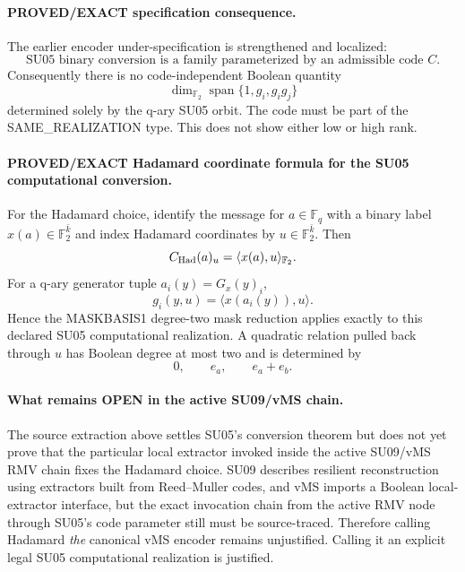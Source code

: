 \documentclass[11pt]{article}
\begin{document}
\paragraph{PROVED/EXACT specification consequence.}
The earlier encoder under-specification is strengthened and localized:
\[
\boxed{\text{SU05 binary conversion is a family parameterized by an admissible code }C.}
\]
Consequently there is no code-independent Boolean quantity
\[
\dim_{\mathbb F_2}\operatorname{span}\{1,g_i,g_ig_j\}
\]
determined solely by the q-ary SU05 orbit. The code must be part of the SAME\_REALIZATION type. This does not show either low or high rank.

\paragraph{PROVED/EXACT Hadamard coordinate formula for the SU05 computational conversion.}
For the Hadamard choice, identify the message for $a\in\mathbb F_q$ with a binary label $x(a)\in\mathbb F_2^{\bar k}$ and index Hadamard coordinates by $u\in\mathbb F_2^{\bar k}$. Then
\[
C_{\rm Had}(a)_u=\langle x(a),u\rangle_{\mathbb F_2}.
\]
For a q-ary generator tuple $a_i(y)=G_x(y)_i$,
\[
\boxed{g_i(y,u)=\langle x(a_i(y)),u\rangle.}
\]
Hence the MASKBASIS1 degree-two mask reduction applies exactly to this declared SU05 computational realization. A quadratic relation pulled back through $u$ has Boolean degree at most two and is determined by
\[
0,\qquad e_a,\qquad e_a+e_b.
\]

\paragraph{What remains OPEN in the active SU09/vMS chain.}
The source extraction above settles SU05's conversion theorem but does not yet prove that the particular local extractor invoked inside the active SU09/vMS RMV chain fixes the Hadamard choice. SU09 describes resilient reconstruction using extractors built from Reed--Muller codes, and vMS imports a Boolean local-extractor interface, but the exact invocation chain from the active RMV node through SU05's code parameter still must be source-traced. Therefore calling Hadamard \emph{the} canonical vMS encoder remains unjustified. Calling it an explicit legal SU05 computational realization is justified.
\end{document}
